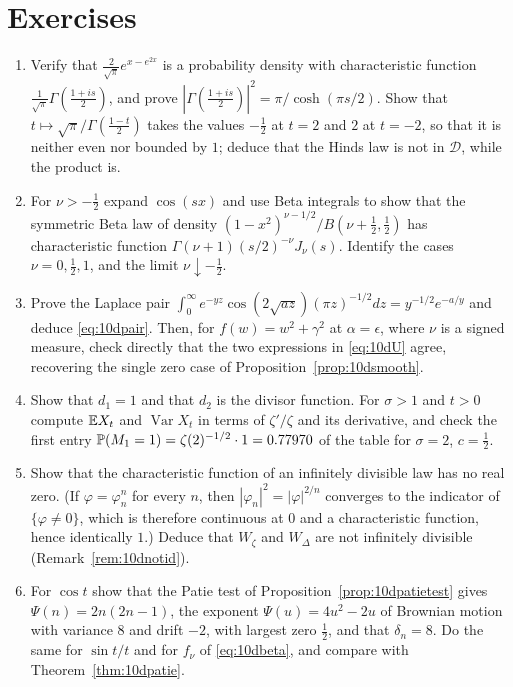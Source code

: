 \section{Exercises}

\begin{enumerate}
\item Verify that $\frac2{\sqrt\pi}e^{x-e^{2x}}$ is a probability density with characteristic function $\frac1{\sqrt\pi}\Gamma(\frac{1+is}2)$, and prove $|\Gamma(\frac{1+is}2)|^2 = \pi/\cosh(\pi s/2)$. Show that $t\mapsto\sqrt\pi/\Gamma(\frac{1-t}2)$ takes the values $-\frac12$ at $t=2$ and $2$ at $t=-2$, so that it is neither even nor bounded by $1$; deduce that the Hinds law is not in $\mathcal D$, while the product is.
\item\label{ex:10dbeta} For $\nu>-\frac12$ expand $\cos(sx)$ and use Beta integrals to show that the symmetric Beta law of density $(1-x^2)^{\nu-1/2}/B(\nu+\frac12,\frac12)$ has characteristic function $\Gamma(\nu+1)(s/2)^{-\nu}J_\nu(s)$. Identify the cases $\nu = 0,\frac12,1$, and the limit $\nu\downarrow-\frac12$.
\item Prove the Laplace pair $\int_0^\infty e^{-yz}\cos(2\sqrt{az})(\pi z)^{-1/2}dz = y^{-1/2}e^{-a/y}$ and deduce \eqref{eq:10dpair}. Then, for $f(w) = w^2+\gamma^2$ at $\alpha = \epsilon$, where $\nu$ is a signed measure, check directly that the two expressions in \eqref{eq:10dU} agree, recovering the single zero case of Proposition~\ref{prop:10dsmooth}.
\item Show that $d_1 = 1$ and that $d_2$ is the divisor function. For $\sigma>1$ and $t>0$ compute $\mathbb{E} X_t$ and $\operatorname{Var}X_t$ in terms of $\zeta'/\zeta$ and its derivative, and check the first entry $\mathbb{P}(M_1 = 1) = \zeta(2)^{-1/2}\cdot1 = 0.77970$ of the table for $\sigma = 2$, $c = \frac12$.
\item\label{ex:10dnotid} Show that the characteristic function of an infinitely divisible law has no real zero. (If $\varphi = \varphi_n^n$ for every $n$, then $|\varphi_n|^2 = |\varphi|^{2/n}$ converges to the indicator of $\{\varphi\ne0\}$, which is therefore continuous at $0$ and a characteristic function, hence identically $1$.) Deduce that $W_\zeta$ and $W_\Delta$ are not infinitely divisible (Remark~\ref{rem:10dnotid}).
\item For $\cos t$ show that the Patie test of Proposition~\ref{prop:10dpatietest} gives $\Psi(n) = 2n(2n-1)$, the exponent $\Psi(u) = 4u^2-2u$ of Brownian motion with variance $8$ and drift $-2$, with largest zero $\frac12$, and that $\delta_n = 8$. Do the same for $\sin t/t$ and for $f_\nu$ of \eqref{eq:10dbeta}, and compare with Theorem~\ref{thm:10dpatie}.
\end{enumerate}

